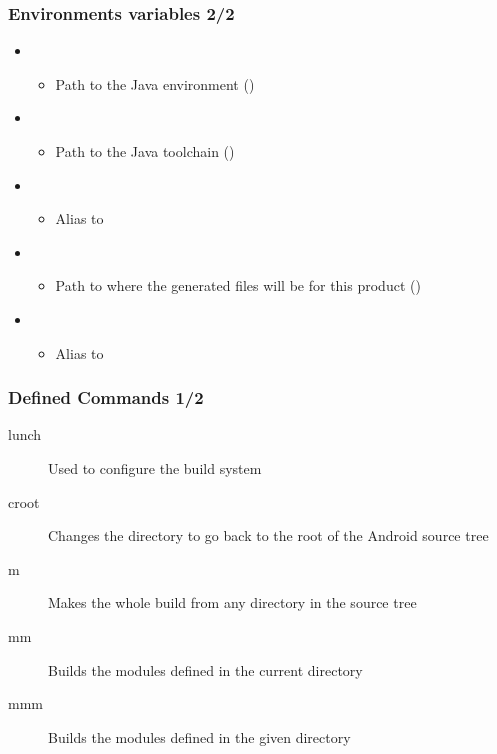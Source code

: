 \begin{frame}
  \frametitle{Environments variables 2/2}
  \begin{itemize}
  \item {}
    \begin{itemize}
    \item Path to the Java environment
      ()
    \end{itemize}
  \item {}
    \begin{itemize}
    \item Path to the Java toolchain ()
    \end{itemize}
  \item {}
    \begin{itemize}
    \item Alias to 
    \end{itemize}
  \item {}
    \begin{itemize}
    \item Path to where the generated files will be for this product
      ()
    \end{itemize}
  \item {}
    \begin{itemize}
      \item Alias to 
    \end{itemize}
  \end{itemize}
\end{frame}

\begin{frame}
  \frametitle{Defined Commands 1/2}
  \begin{description}
  \item[lunch] Used to configure the build system
  \item[croot] Changes the directory to go back to the root of the
    Android source tree
  \item[m] Makes the whole build from any directory in the source tree
  \item[mm] Builds the modules defined in the current directory
  \item[mmm] Builds the modules defined in the given directory
  \end{description}
\end{frame}

